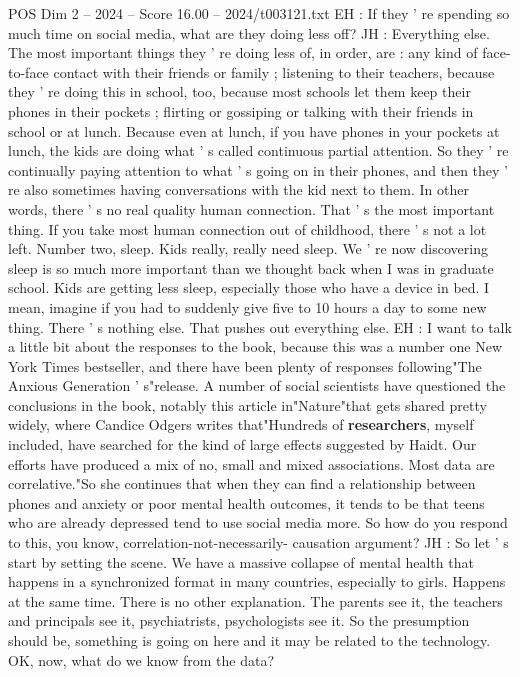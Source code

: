\begin{textsample}{POS Dim 2 – 2024 – Score 16.00 – 2024/t003121.txt}
EH : If they ' re spending so much time on social media, what are they doing less off?
JH : Everything else.
The most important things they ' re doing less of, in order, are : any kind of face-to-face contact with their friends or family ; listening to their teachers, because they ' re doing this in school, too, because most schools let them keep their phones in their pockets ; flirting or gossiping or talking with their friends in school or at lunch.
Because even at lunch, if you have phones in your pockets at lunch, the kids are doing what ' s called continuous partial attention.
So they ' re continually paying attention to what ' s going on in their phones, and then they ' re also sometimes having conversations with the kid next to them.
In other words, there ' s no real quality human connection.
That ' s the most important thing.
If you take most human connection out of childhood, there ' s not a lot left.
Number two, sleep.
Kids really, really need sleep.
We ' re now discovering sleep is so much more important than we thought back when I was in graduate school.
Kids are getting less sleep, especially those who have a device in bed.
I mean, imagine if you had to suddenly give five to 10 hours a day to some new thing.
There ' s nothing else.
That pushes out everything else.
EH : I want to talk a little bit about the responses to the book, because this was a number one New York Times bestseller, and there have been plenty of responses following"The Anxious Generation ' s"release.
A number of social scientists have questioned the conclusions in the book, notably this article in"Nature"that gets shared pretty widely, where Candice Odgers writes that"Hundreds of \textbf{researchers}, myself included, have searched for the kind of large effects suggested by Haidt.
Our efforts have produced a mix of no, small and mixed associations.
Most data are correlative."So she continues that when they can find a relationship between phones and anxiety or poor mental health outcomes, it tends to be that teens who are already depressed tend to use social media more.
So how do you respond to this, you know, correlation-not-necessarily- causation argument?
JH : So let ' s start by setting the scene.
We have a massive collapse of mental health that happens in a synchronized format in many countries, especially to girls.
Happens at the same time.
There is no other explanation.
The parents see it, the teachers and principals see it, psychiatrists, psychologists see it.
So the presumption should be, something is going on here and it may be related to the technology.
OK, now, what do we know from the data?

\end{textsample}
